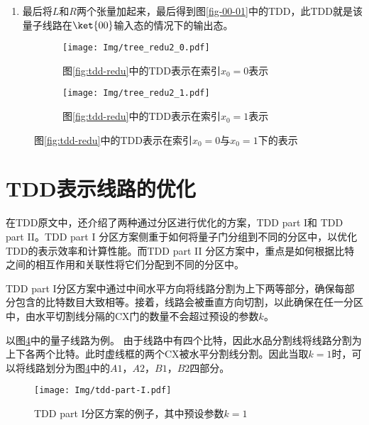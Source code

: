 \begin{example}
\begin{enumerate}
        \item 最后将\(L\)和\(R\)两个张量加起来，最后得到图\ref{fig-00-01}中的TDD，此TDD就是该量子线路在\(\ket{00}\)输入态的情况下的输出态。
    \end{enumerate}
    \begin{figure}
        \centering
        \begin{subfigure}[b]{.45\textwidth}
            \texttt{[image: Img/tree\_redu2\_0.pdf]}
            \caption{图\ref{fig:tdd-redu}中的TDD表示在索引\(x_0=0\)表示}
            \label{fig:cir-0}
        \end{subfigure}
        \begin{subfigure}[b]{.45\textwidth}
            \texttt{[image: Img/tree\_redu2\_1.pdf]}
            \caption{图\ref{fig:tdd-redu}中的TDD表示在索引\(x_0=1\)表示}
            \label{fig:cir-1}
        \end{subfigure}
        \caption{图\ref{fig:tdd-redu}中的TDD表示在索引\(x_0=0\)与\(x_0=1\)下的表示}
        \label{fig:cir-01}
    \end{figure}
\end{example}
\section{TDD表示线路的优化}
在TDD原文中\citep{Hong_2022}，还介绍了两种通过分区进行优化的方案，TDD part I和 TDD part II。TDD part I 分区方案侧重于如何将量子门分组到不同的分区中，以优化TDD的表示效率和计算性能。而TDD part II 分区方案中，重点是如何根据比特之间的相互作用和关联性将它们分配到不同的分区中。

TDD part I分区方案中通过中间水平方向将线路分割为上下两等部分，确保每部分包含的比特数目大致相等。接着，线路会被垂直方向切割，以此确保在任一分区中，由水平切割线分隔的CX门的数量不会超过预设的参数$k$。
\begin{example}
    以图\ref{fig:tdd-part-I}中的量子线路为例。
由于线路中有四个比特，因此水品分割线将线路分割为上下各两个比特。此时虚线框的两个CX被水平分割线分割。因此当取\(k=1\)时，可以将线路划分为图\ref{fig:tdd-part-I}中的\(A1\)，\(A2\)，\(B1\)，\(B2\)四部分。
\begin{figure}[!htbp]
    \centering
    \texttt{[image: Img/tdd-part-I.pdf]}
    \caption{TDD part I分区方案的例子，其中预设参数\(k=1\)}
    \label{fig:tdd-part-I}
\end{figure}
\end{example}

